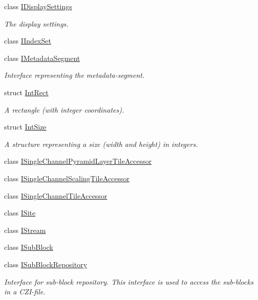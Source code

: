 \begin{DoxyCompactItemize}
class \hyperlink{classlib_c_z_i_1_1_i_display_settings}{I\+Display\+Settings}
\begin{DoxyCompactList}\small\item\em The display settings. \end{DoxyCompactList}\item 
class \hyperlink{classlib_c_z_i_1_1_i_index_set}{I\+Index\+Set}
\item 
class \hyperlink{classlib_c_z_i_1_1_i_metadata_segment}{I\+Metadata\+Segment}
\begin{DoxyCompactList}\small\item\em Interface representing the metadata-\/segment. \end{DoxyCompactList}\item 
struct \hyperlink{structlib_c_z_i_1_1_int_rect}{Int\+Rect}
\begin{DoxyCompactList}\small\item\em A rectangle (with integer coordinates). \end{DoxyCompactList}\item 
struct \hyperlink{structlib_c_z_i_1_1_int_size}{Int\+Size}
\begin{DoxyCompactList}\small\item\em A structure representing a size (width and height) in integers. \end{DoxyCompactList}\item 
class \hyperlink{classlib_c_z_i_1_1_i_single_channel_pyramid_layer_tile_accessor}{I\+Single\+Channel\+Pyramid\+Layer\+Tile\+Accessor}
\item 
class \hyperlink{classlib_c_z_i_1_1_i_single_channel_scaling_tile_accessor}{I\+Single\+Channel\+Scaling\+Tile\+Accessor}
\item 
class \hyperlink{classlib_c_z_i_1_1_i_single_channel_tile_accessor}{I\+Single\+Channel\+Tile\+Accessor}
\item 
class \hyperlink{classlib_c_z_i_1_1_i_site}{I\+Site}
\item 
class \hyperlink{classlib_c_z_i_1_1_i_stream}{I\+Stream}
\item 
class \hyperlink{classlib_c_z_i_1_1_i_sub_block}{I\+Sub\+Block}
\item 
class \hyperlink{classlib_c_z_i_1_1_i_sub_block_repository}{I\+Sub\+Block\+Repository}
\begin{DoxyCompactList}\small\item\em Interface for sub-\/block repository. This interface is used to access the sub-\/blocks in a C\+Z\+I-\/file. \end{DoxyCompactList}\item 

\end{DoxyCompactItemize}

